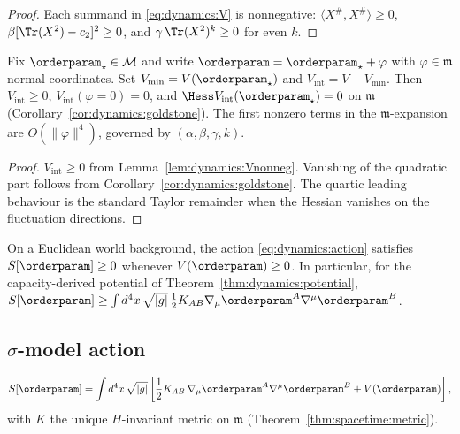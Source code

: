 \begin{proof}
Each summand in \eqref{eq:dynamics:V} is nonnegative:
$\langle X^{\#},X^{\#}\rangle\geq0$,
$\beta[\Tr(X^2)-c_2]^2\geq0$, and $\gamma\,\Tr(X^2)^k\geq0$ for even $k$.
\end{proof}

\begin{lemma}\label{lem:dynamics:interaction}
Fix $\orderparam_\star\in\mathcal{M}$ and write
$\orderparam=\orderparam_\star+\varphi$ with $\varphi\in\mathfrak{m}$ normal
coordinates. Set $V_{\min}=V(\orderparam_\star)$ and
$V_{\mathrm{int}}=V-V_{\min}$. Then $V_{\mathrm{int}}\geq0$,
$V_{\mathrm{int}}(\varphi=0)=0$, and
$\Hess V_{\mathrm{int}}(\orderparam_\star)=0$ on $\mathfrak{m}$
(Corollary~\ref{cor:dynamics:goldstone}). The first nonzero terms in the
$\mathfrak{m}$-expansion are $O(\|\varphi\|^4)$, governed by
$(\alpha,\beta,\gamma,k)$.
\end{lemma}

\begin{proof}
$V_{\mathrm{int}}\geq0$ from Lemma~\ref{lem:dynamics:Vnonneg}. Vanishing of
the quadratic part follows from Corollary~\ref{cor:dynamics:goldstone}. The
quartic leading behaviour is the standard Taylor remainder when the Hessian
vanishes on the fluctuation directions.
\end{proof}

\begin{proposition}\label{prop:dynamics:action-bounded}
On a Euclidean world background, the action \eqref{eq:dynamics:action}
satisfies $S[\orderparam]\geq0$ whenever $V(\orderparam)\geq0$. In
particular, for the capacity-derived potential of
Theorem~\ref{thm:dynamics:potential}, $S[\orderparam]\geq
\int d^4x\,\sqrt{|g|}\,\frac{1}{2}K_{AB}\nabla_\mu\orderparam^A\nabla^\mu\orderparam^B$.
\end{proposition}

\subsection{$\sigma$-model action}
\label{sec:dynamics:action}

\begin{equation}\label{eq:dynamics:action}
  S[\orderparam]=\int d^4x\,\sqrt{|g|}\left[
    \frac{1}{2}K_{AB}\,\nabla_\mu\orderparam^A\nabla^\mu\orderparam^B
    +V(\orderparam)\right],
\end{equation}
with $K$ the unique $H$-invariant metric on $\mathfrak{m}$
(Theorem~\ref{thm:spacetime:metric}).

